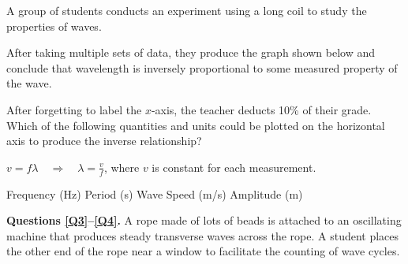 \documentclass[answers]{exam}
\begin{document}
\begin{questions}
\question
A group of students conducts an experiment using a long coil to study the properties of waves.

\begin{center}
\end{center}

After taking multiple sets of data, they produce the graph shown below and conclude that wavelength is inversely proportional to some measured property of the wave.

\begin{center}
\end{center}

After forgetting to label the $x$-axis, the teacher deducts 10\% of their grade. Which of the following quantities and units could be plotted on the horizontal axis to produce the inverse relationship?

\ifprintanswers
{\color{red}
$v = f \lambda \quad \Rightarrow \quad \lambda = \frac{v}{f}$, where $v$ is constant for each measurement.
}
\fi

\begin{randomizechoices}
    \correctchoice Frequency (Hz)
    \choice Period (s)
    \choice Wave Speed (m/s)
    \choice Amplitude (m)
\end{randomizechoices}



\begin{EnvUplevel}
\textbf{Questions \ref{Q3}--\ref{Q4}.} A rope made of lots of beads is attached to an oscillating machine that produces steady transverse waves across the rope. A student places the other end of the rope near a window to facilitate the counting of wave cycles.


\end{EnvUplevel}
\end{questions}
\end{document}
